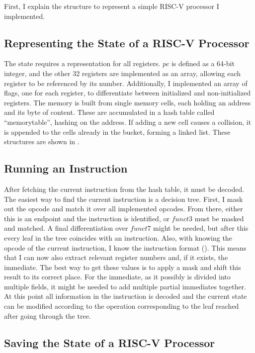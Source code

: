 First, I explain the structure to represent a simple RISC-V processor
I implemented.

\subsection{Representing the State of a RISC-V Processor}
The state requires a representation for all registers. $pc$ is
defined as a 64-bit integer, and the other 32 registers are
implemented as an array, allowing each register to be referenced by
its number. Additionally, I implemented an array of flags, one for
each register, to differentiate between initialized and
non-initialized registers. The memory is built from single memory
cells, each holding an address and its byte of content. These are
accumulated in a hash table called \enquote{memorytable}, hashing on
the address. If adding a new cell causes a collision, it is appended
to the cells already in the bucket, forming a linked list. These
structures are shown in .



\subsection{Running an Instruction}\label{sec:runInstr}
After fetching the current instruction from the hash table, it must
be decoded. The easiest way to find the current instruction is a
decision tree. First, I mask out the opcode and match it over all
implemented opcodes. From there, either this is an endpoint and the
instruction is identified, or $funct3$ must be masked and matched. A
final differentiation over $funct7$ might be needed, but after this
every leaf in the tree coincides with an instruction. Also, with
knowing the opcode of the current instruction, I know the instruction
format (). This means that I can now also
extract relevant register numbers and, if it exists, the immediate.
The best way to get these values is to apply a mask and shift this
result to its correct place. For the immediate, as it possibly is
divided into multiple fields, it might be needed to add multiple
partial immediates together. At this point all information in the
instruction is decoded and the current state can be modified
according to the operation corresponding to the leaf reached after
going through the tree. 

\subsection{Saving the State of a RISC-V
      Processor}\label{sub:statefile}

